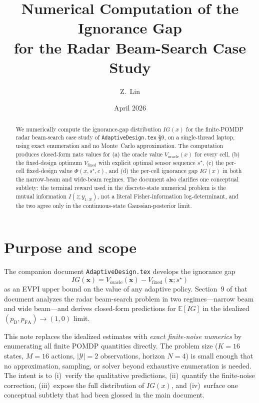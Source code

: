 \documentclass[11pt,a4paper]{article}
\title{Numerical Computation of the Ignorance Gap\\for the Radar Beam-Search Case Study}
\author{Z.\ Lin}
\date{April 2026}
\newcommand{\E}{\mathbb{E}}
\begin{document}
\maketitle

\begin{abstract}
We numerically compute the ignorance-gap distribution $IG(x)$ for the finite-POMDP radar beam-search case study of \texttt{AdaptiveDesign.tex} \S9, on a single-thread laptop, using exact enumeration and no Monte~Carlo approximation.  The computation produces closed-form nats values for (a) the oracle value $V_{\text{oracle}}(x)$ for every cell, (b) the fixed-design optimum $V_{\text{fixed}}$ with explicit optimal sensor sequence $s^\star$, (c) the per-cell fixed-design value $\Phi(x, s^\star, c)$, and (d) the per-cell ignorance gap $IG(x)$ in both the narrow-beam and wide-beam regimes.  The document also clarifies one conceptual subtlety: the terminal reward used in the discrete-state numerical problem is the mutual information $I(z; y_{1:N})$, not a literal Fisher-information log-determinant, and the two agree only in the continuous-state Gaussian-posterior limit.
\end{abstract}

\tableofcontents

\section{Purpose and scope}

The companion document \texttt{AdaptiveDesign.tex} develops the ignorance gap
\[
  IG(\bm{x}) = V_{\text{oracle}}(\bm{x}) - V_{\text{fixed}}(\bm{x}; s^\star)
\]
as an EVPI upper bound on the value of any adaptive policy.  Section~9 of that document analyzes the radar beam-search problem in two regimes---narrow beam and wide beam---and derives closed-form predictions for $\E[IG]$ in the idealized $(p_{\mathrm{D}}, p_{\mathrm{FA}}) \to (1, 0)$ limit.

This note replaces the idealized estimates with \emph{exact finite-noise numerics} by enumerating all finite POMDP quantities directly.  The problem size ($K = 16$ states, $M = 16$ actions, $|\mathcal{Y}| = 2$ observations, horizon $N = 4$) is small enough that no approximation, sampling, or solver beyond exhaustive enumeration is needed.  The intent is to (i)~verify the qualitative predictions, (ii)~quantify the finite-noise correction, (iii)~expose the full distribution of $IG(x)$, and (iv)~surface one conceptual subtlety that had been glossed in the main document.
\end{document}
